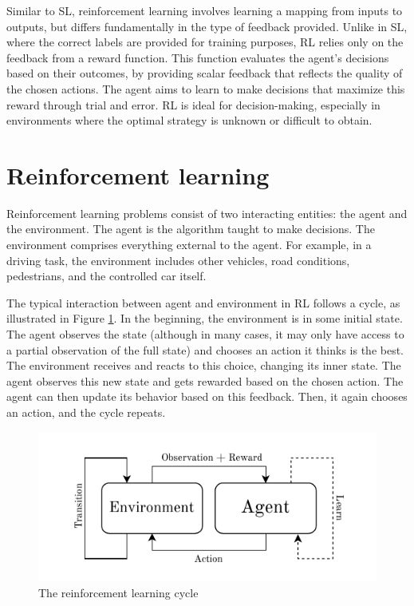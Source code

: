 \documentclass[
  digital,     %
  oneside,     %
  nosansbold,  %
  nocolorbold, %
  lof,         %
  lot,         %
]{fithesis4}
\begin{document}
Similar to SL, reinforcement learning involves learning a mapping from inputs to outputs, but differs fundamentally in the type of feedback provided. Unlike in SL, where the correct labels are provided for training purposes, RL relies only on the feedback from a reward function. This function evaluates the agent's decisions based on their outcomes, by providing scalar feedback that reflects the quality of the chosen actions. The agent aims to learn to make decisions that maximize this reward through trial and error. RL is ideal for decision-making, especially in environments where the optimal strategy is unknown or difficult to obtain.

\section{Reinforcement learning}
Reinforcement learning problems consist of two interacting entities: the agent and the environment. The agent is the algorithm taught to make decisions. The environment comprises everything external to the agent. For example, in a driving task, the environment includes other vehicles, road conditions, pedestrians, and the controlled car itself.

The typical interaction between agent and environment in RL follows a cycle, as illustrated in Figure \ref{fig:rl-cycle}. In the beginning, the environment is in some initial state. The agent observes the state (although in many cases, it may only have access to a partial observation of the full state) and chooses an action it thinks is the best. The environment receives and reacts to this choice, changing its inner state. The agent observes this new state and gets rewarded based on the chosen action. The agent can then update its behavior based on this feedback. Then, it again chooses an action, and the cycle repeats.

\begin{figure}
    \centering
    \includegraphics[width=1\linewidth]{diagrams/rl_cycle.pdf}
    \caption{The reinforcement learning cycle}
    \label{fig:rl-cycle}
\end{figure}
\end{document}
